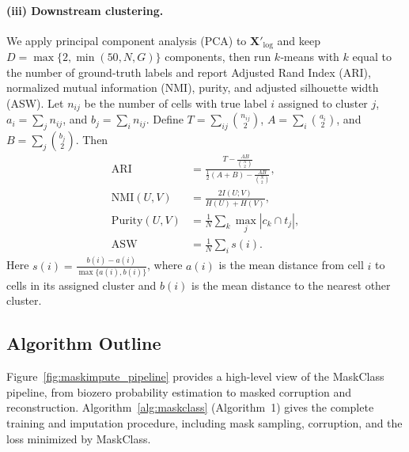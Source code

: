 \documentclass{article}
\theoremstyle{plain}
\theoremstyle{definition}
\theoremstyle{remark}
\begin{document}
\paragraph{(iii) Downstream clustering.}
We apply principal component analysis (PCA) to $\mathbf{X}'_{\log}$ and keep
$D=\max\{2,\min(50,N,G)\}$ components, then run $k$‑means with $k$ equal to
the number of ground-truth labels and report Adjusted Rand Index (ARI),
normalized mutual information (NMI), purity, and adjusted silhouette width (ASW). Let
$n_{ij}$ be the number of cells with true label $i$ assigned to cluster $j$,
$a_i=\sum_j n_{ij}$, and $b_j=\sum_i n_{ij}$. Define
$T=\sum_{ij}\binom{n_{ij}}{2}$, $A=\sum_i\binom{a_i}{2}$, and
$B=\sum_j\binom{b_j}{2}$. Then
\[
\begin{aligned}
\text{ARI} &= \frac{T-\frac{AB}{\binom{N}{2}}}{\frac{1}{2}(A+B)-\frac{AB}{\binom{N}{2}}},\\
\text{NMI}(U,V) &= \frac{2I(U;V)}{H(U)+H(V)},\\
\text{Purity}(U,V) &= \frac{1}{N}\sum_k \max_j |c_k\cap t_j|,\\
\text{ASW} &= \frac{1}{N}\sum_i s(i).
\end{aligned}
\]
Here $s(i)=\frac{b(i)-a(i)}{\max\{a(i),b(i)\}}$, where $a(i)$ is the mean
distance from cell $i$ to cells in its assigned cluster and $b(i)$ is the mean
distance to the nearest other cluster.

\subsection{Algorithm Outline}
Figure~\ref{fig:maskimpute_pipeline} provides a high-level view of the MaskClass
pipeline, from biozero probability estimation to masked corruption and
reconstruction. Algorithm~\ref{alg:maskclass} (Algorithm~1) gives the complete
training and imputation procedure, including mask sampling, corruption, and the
loss minimized by MaskClass.
\end{document}
